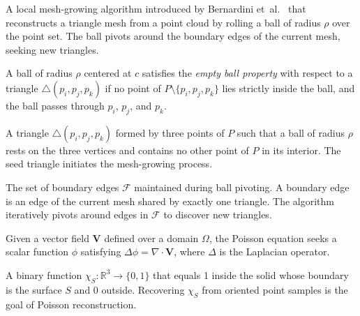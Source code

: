 \begin{definition}\label{def:ball_pivoting}
A local mesh-growing algorithm introduced by Bernardini et~al.~\cite{bernardini1999} that reconstructs a triangle mesh from a point cloud by rolling a ball of radius $\rho$ over the point set. The ball pivots around the boundary edges of the current mesh, seeking new triangles.
\end{definition}

\begin{definition}\label{def:empty_ball}
A ball of radius $\rho$ centered at $c$ satisfies the \emph{empty ball property} with respect to a triangle $\triangle(p_i, p_j, p_k)$ if no point of $P \setminus \{p_i, p_j, p_k\}$ lies strictly inside the ball, and the ball passes through $p_i$, $p_j$, and $p_k$.
\end{definition}

\begin{definition}\label{def:seed_triangle}
A triangle $\triangle(p_i, p_j, p_k)$ formed by three points of $P$ such that a ball of radius $\rho$ rests on the three vertices and contains no other point of $P$ in its interior. The seed triangle initiates the mesh-growing process.
\end{definition}

\begin{definition}\label{def:boundary_edge_front}
The set of boundary edges $\mathcal{F}$ maintained during ball pivoting. A boundary edge is an edge of the current mesh shared by exactly one triangle. The algorithm iteratively pivots around edges in $\mathcal{F}$ to discover new triangles.
\end{definition}

\begin{definition}\label{def:poisson_equation}
Given a vector field $\mathbf{V}$ defined over a domain $\Omega$, the Poisson equation seeks a scalar function $\phi$ satisfying $\Delta \phi = \nabla \cdot \mathbf{V}$, where $\Delta$ is the Laplacian operator.
\end{definition}

\begin{definition}\label{def:indicator_function}
A binary function $\chi_S : \mathbb{R}^3 \to \{0, 1\}$ that equals 1 inside the solid whose boundary is the surface $S$ and 0 outside. Recovering $\chi_S$ from oriented point samples is the goal of Poisson reconstruction.
\end{definition}

